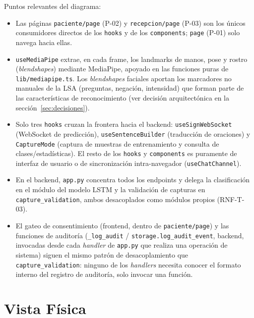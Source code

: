 Puntos relevantes del diagrama:
\begin{itemize}
    \item Las páginas \texttt{paciente/page} (P-02) y \texttt{recepcion/page}
    (P-03) son los únicos consumidores directos de los \texttt{hooks} y de
    los \texttt{components}; \texttt{page} (P-01) solo navega hacia ellas.
    \item \texttt{useMediaPipe} extrae, en cada frame, los landmarks de
    manos, pose y rostro (\textit{blendshapes}) mediante MediaPipe, apoyado
    en las funciones puras de \texttt{lib/mediapipe.ts}. Los
    \textit{blendshapes} faciales aportan los marcadores no manuales de la
    LSA (preguntas, negación, intensidad) que forman parte de las
    características de reconocimiento (ver decisión arquitectónica en la
    sección~\ref{sec:decisiones}).
    \item Solo tres \texttt{hooks} cruzan la frontera hacia el backend:
    \texttt{useSignWebSocket} (WebSocket de predicción),
    \texttt{useSentenceBuilder} (traducción de oraciones) y
    \texttt{CaptureMode} (captura de muestras de entrenamiento y consulta de
    clases/estadísticas). El resto de los \texttt{hooks} y \texttt{components}
    es puramente de interfaz de usuario o de sincronización intra-navegador
    (\texttt{useChatChannel}).
    \item En el backend, \texttt{app.py} concentra todos los endpoints y
    delega la clasificación en el módulo del modelo LSTM y la validación de
    capturas en \texttt{capture\_validation}, ambos desacoplados como
    módulos propios (RNF-T-03).
    \item El gateo de consentimiento (frontend, dentro de
    \texttt{paciente/page}) y las funciones de auditoría
    (\texttt{\_log\_audit} / \texttt{storage.log\_audit\_event}, backend, invocadas
    desde cada \textit{handler} de \texttt{app.py} que realiza una
    operación de sistema) siguen el mismo patrón de desacoplamiento que
    \texttt{capture\_validation}: ninguno de los \textit{handlers}
    necesita conocer el formato interno del registro de auditoría, solo
    invocar una función.
\end{itemize}

\section{Vista Física}
\label{sec:vista-fisica}


